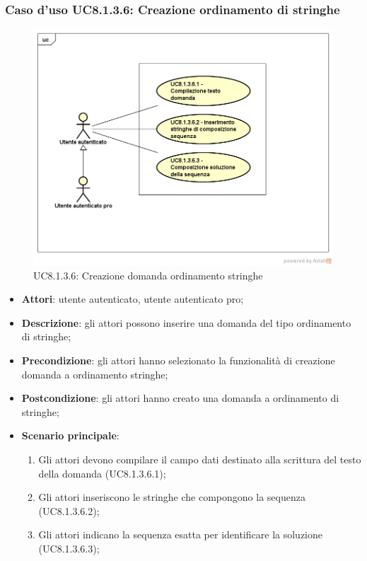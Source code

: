 \subsubsection{Caso d’uso UC8.1.3.6: Creazione ordinamento di stringhe}
	\label{UC8.1.3.6}
	\begin{figure}[h]
		\centering
			\includegraphics[scale=0.45,keepaspectratio]{UML/UC8_1_3_6.png}
		\caption{UC8.1.3.6: Creazione domanda ordinamento stringhe}
	\end{figure}
	\FloatBarrier
\begin{itemize}
	\item\textbf{Attori}: utente autenticato, utente autenticato pro;
	\item\textbf{Descrizione}: gli attori possono inserire una domanda del tipo ordinamento di stringhe;
	\item \textbf{Precondizione}: gli attori hanno selezionato la funzionalità di creazione domanda a ordinamento stringhe;
	\item\textbf{Postcondizione}: gli attori hanno creato una domanda a ordinamento di stringhe;
	\item\textbf{Scenario principale}:
		\begin{enumerate}
			\item Gli attori devono compilare il campo dati destinato alla scrittura del testo della domanda (UC8.1.3.6.1);
			\item Gli attori inseriscono le stringhe che compongono la sequenza (UC8.1.3.6.2);
			\item Gli attori indicano la sequenza esatta per identificare la soluzione (UC8.1.3.6.3);
		\end{enumerate}
\end{itemize}

